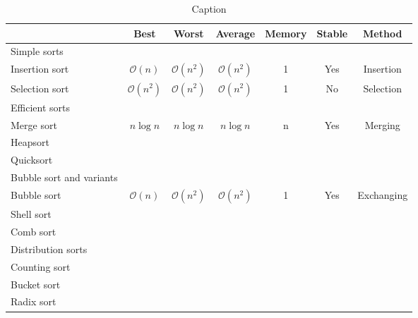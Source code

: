 \documentclass{article}
\begin{document}
\begin{table}[]
    \centering
    \begin{tabular}{l ccc  ccc}
    \hline\hline
                 & Best  & Worst   & Average & Memory & Stable & Method \\
                  \hline 
Simple sorts   &          &              &              &               &   & \\
\hspace{16pt}Insertion sort  &  $\mathcal{O}(n)$ & $\mathcal{O}(n^2)$ & $\mathcal{O}(n^2)$ & 1 & Yes& Insertion \\
\hspace{16pt}Selection sort &  $\mathcal{O}(n^2)$ & $\mathcal{O}(n^2)$ & $\mathcal{O}(n^2)$ & 1 & No& Selection \\      Efficient sorts &          &              &              &               &   & \\
\hspace{16pt} Merge sort    &  $n \log n$     &  $n \log n$           &  $n \log n$              &    n           & Yes   & Merging \\
\hspace{16pt} Heapsort       &          &              &              &               &   & \\
\hspace{16pt} Quicksort      &          &              &              &               &   & \\
Bubble sort and variants &          &              &              &               &   & \\
\hspace{16pt} Bubble sort  & $\mathcal{O}(n)$ & $\mathcal{O}(n^2)$ & $\mathcal{O}(n^2)$ & 1 & Yes& Exchanging \\
\hspace{16pt} Shell sort     &          &              &              &               &   & \\
\hspace{16pt} Comb sort   &          &              &              &               &   & \\
Distribution sorts &           &              &              &               &   & \\
\hspace{16pt} Counting sort  &          &              &              &               &   & \\
\hspace{16pt} Bucket sort      &          &              &              &               &   & \\
\hspace{16pt} Radix sort        &          &              &              &               &   & \\
    \hline\hline
    \end{tabular}
    \caption{Caption}
    \label{tab:my_label}
\end{table}
\end{document}
